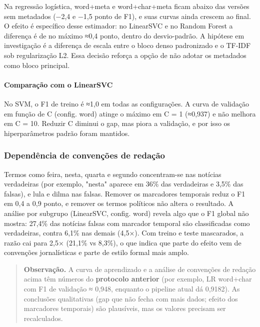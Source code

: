 \documentclass[
  brazilian,
  11pt,
]{article}
\begin{document}
Na regressão logística, word+meta e word+char+meta ficam abaixo das versões sem metadados (−2,4 e −1,5 ponto de F1), e suas curvas ainda crescem ao final. O efeito é específico desse estimador: no LinearSVC e no Random Forest a diferença é de no máximo ≈0,4 ponto, dentro do desvio-padrão. A hipótese em investigação é a diferença de escala entre o bloco denso padronizado e o TF-IDF sob regularização L2. Essa decisão reforça a opção de não adotar os metadados como bloco principal.

\paragraph{Comparação com o LinearSVC}\label{comparauxe7uxe3o-com-o-linearsvc}

No SVM, o F1 de treino é ≈1,0 em todas as configurações. A curva de validação em função de C (config. word) atinge o máximo em C = 1 (≈0,937) e não melhora em C = 10. Reduzir C diminui o gap, mas piora a validação, e por isso os hiperparâmetros padrão foram mantidos.

\subsubsection{Dependência de convenções de redação}\label{dependuxeancia-de-convenuxe7uxf5es-de-redauxe7uxe3o}

Termos como feira, nesta, quarta e segundo concentram-se nas notícias verdadeiras (por exemplo, "nesta" aparece em 36\% das verdadeiras e 3,5\% das falsas), e lula e dilma nas falsas. Remover os marcadores temporais reduz o F1 em 0,4 a 0,9 ponto, e remover os termos políticos não altera o resultado. A análise por subgrupo (LinearSVC, config. word) revela algo que o F1 global não mostra: 27,4\% das notícias falsas com marcador temporal são classificadas como verdadeiras, contra 6,1\% nas demais (4,5×). Com treino e teste mascarados, a razão cai para 2,5× (21,1\% vs 8,3\%), o que indica que parte do efeito vem de convenções jornalísticas e parte de estilo formal mais amplo.

\begin{quote}
\textbf{Observação.} A curva de aprendizado e a análise de convenções de redação acima têm números do \textbf{protocolo anterior} (por exemplo, LR word+char com F1 de validação ≈ 0,948, enquanto o pipeline atual dá 0,9182). As conclusões qualitativas (gap que não fecha com mais dados; efeito dos marcadores temporais) são plausíveis, mas os valores precisam ser recalculados.
\end{quote}
\end{document}
